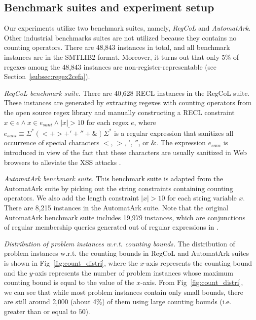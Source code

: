 \subsection{Benchmark suites and experiment setup}\label{sec:bench}

Our experiments utilize two benchmark suites, namely, \emph{RegCoL} and \emph{AutomatArk}. Other industrial benchmarks suites are not utilized because they contains no counting operators. There are 48,843 instances in total, and all benchmark instances are in the SMTLIB2 format.
Moreover, it turns out that only 5\% of regexes among the 48,843 instances are non-register-representable (see Section~\ref{subsec:regex2cefa}).

\medskip
\noindent
\emph{RegCoL benchmark suite.} There are 40,628 RECL instances in the RegCoL suite. These instances are generated by extracting regexes with counting operators from the open source regex library \cite{regex_lingua_franca,redos_lenka} and manually constructing a RECL constraint $x \in e \wedge x \in e_{sani} \wedge |x| > 10$ for each regex $e$,
where $e_{sani} \equiv \overline{\Sigma^*(<+ >+'+''+\&)\Sigma^*}$ is a regular expression that sanitizes all occurrence of special characters $<$, $>$, $'$, $''$, or $\&$. 
The expression $e_{sani}$ is introduced in view of the fact that these characters are usually sanitized in Web browsers to alleviate the XSS attacks \cite{malware_detection_3_kudzu,CCH_18}.

\medskip
\noindent
\emph{AutomatArk benchmark suite.}
This benchmark suite is adapted from the AutomatArk suite \cite{z3str3re} by picking out the string constraints containing counting operators. We also add the length constraint $|x| > 10$ for each string variable $x$. There are 8,215 instances in the AutomatArk suite.
Note that the original AutomatArk benchmark suite \cite{z3str3re} includes 19,979 instances, which are conjunctions of regular membership queries generated out of regular expressions in \cite{automatark}.

\medskip
\noindent
\emph{Distribution of problem instances w.r.t. counting bounds. }
The distribution of problem instances w.r.t. the counting bounds in RegCoL and AutomatArk suites is shown in Fig~\ref{fig:count_distri}, where the $x$-axis represents the counting bound and the $y$-axis represents the number of problem instances whose maximum counting bound is equal to the value of the $x$-axis. 
From Fig~\ref{fig:count_distri}, we can see that while most problem instances contain only small bounds, there are still around 2,000  (about 4\%) of them using large counting bounds (i.e. greater than or equal to $50$).

